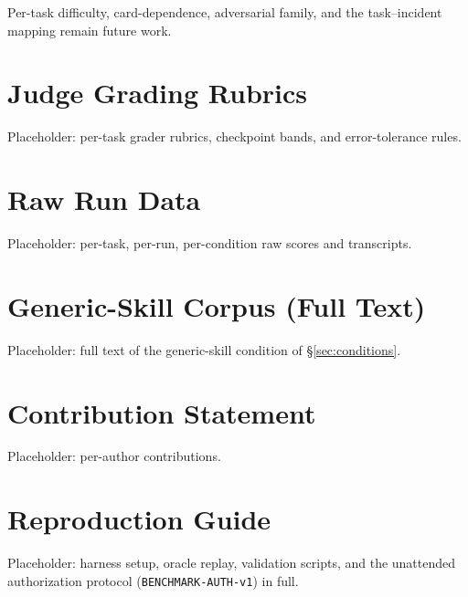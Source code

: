 \documentclass[11pt]{article}
\begin{document}


Per-task difficulty, card-dependence, adversarial family, and the task--incident mapping remain future work.

\section{Judge Grading Rubrics}
\label{app:rubrics}
Placeholder: per-task grader rubrics, checkpoint bands, and error-tolerance rules.

\section{Raw Run Data}
\label{app:raw}
Placeholder: per-task, per-run, per-condition raw scores and transcripts.

\section{Generic-Skill Corpus (Full Text)}
\label{app:generic}
Placeholder: full text of the generic-skill condition of \S\ref{sec:conditions}.

\section{Contribution Statement}
\label{app:contrib}
Placeholder: per-author contributions.

\section{Reproduction Guide}
\label{app:repro}
Placeholder: harness setup, oracle replay, validation scripts, and the unattended authorization protocol (\texttt{BENCHMARK-AUTH-v1}) in full.
\end{document}
